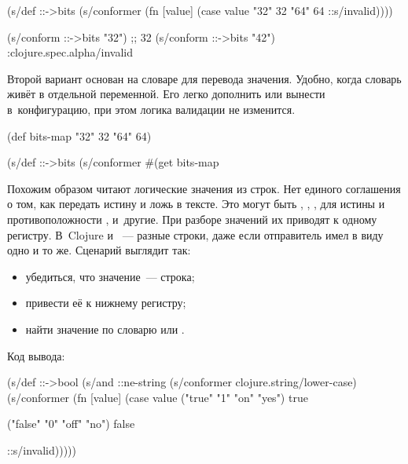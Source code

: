 \else

\begin{clojure}
(s/def ::->bits
  (s/conformer
   (fn [value]
     (case value
       "32" 32 "64" 64
       ::s/invalid))))

(s/conform ::->bits "32") ;; 32
(s/conform ::->bits "42") :clojure.spec.alpha/invalid
\end{clojure}

\fi


Второй вариант основан на словаре для перевода значения. Удобно, когда словарь
живёт в отдельной переменной. Его легко дополнить или вынести в~конфигурацию,
при этом логика валидации не изменится.

\begin{clojure}
(def bits-map {"32" 32 "64" 64})

(s/def ::->bits
  (s/conformer
   #(get bits-map %
\end{clojure}

Похожим образом читают логические значения из строк. Нет единого соглашения о
том, как передать истину и ложь в тексте. Это могут быть ,
, ,  для истины и противоположности ,
 и~другие. При разборе значений их приводят к одному
регистру. В~Clojure  и ~--- разные строки, даже если
отправитель имел в виду одно и то же. Сценарий выглядит так:

\begin{itemize}

\item
  убедиться, что значение~--- строка;

\item
  привести её к нижнему регистру;

\item
  найти значение по словарю или .

\end{itemize}

\noindent
Код вывода:

\ifnarrow

\begin{clojure}
(s/def ::->bool
  (s/and
   ::ne-string
   (s/conformer
     clojure.string/lower-case)
   (s/conformer
    (fn [value]
      (case value
        ("true" "1" "on" "yes")
        true

        ("false" "0" "off" "no")
        false

        ::s/invalid)))))

\end{clojure}

